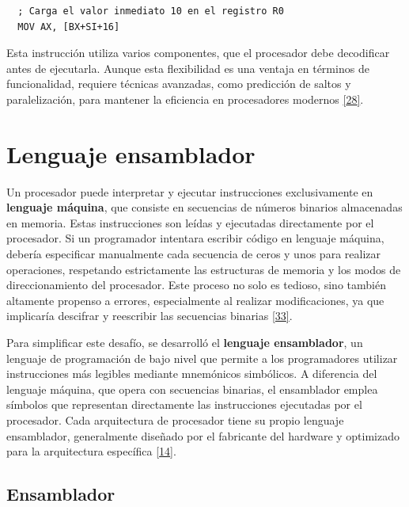 \documentclass[12pt,oneside]{templates/unerthesis}
\begin{document}
\begin{lstlisting}
  ; Carga el valor inmediato 10 en el registro R0
  MOV AX, [BX+SI+16]
  \end{lstlisting}

Esta instrucción utiliza varios componentes, que el procesador debe decodificar antes de ejecutarla. Aunque esta flexibilidad es una ventaja en términos de funcionalidad, requiere técnicas avanzadas, como predicción de saltos y paralelización, para mantener la eficiencia en procesadores modernos \protect\hyperlink{ref-patterson_computer_2014}{{[}28{]}}.

\hypertarget{lenguaje-ensamblador}{%
\section{Lenguaje ensamblador}\label{lenguaje-ensamblador}}

Un procesador puede interpretar y ejecutar instrucciones exclusivamente en \textbf{lenguaje máquina}, que consiste en secuencias de números binarios almacenadas en memoria. Estas instrucciones son leídas y ejecutadas directamente por el procesador. Si un programador intentara escribir código en lenguaje máquina, debería especificar manualmente cada secuencia de ceros y unos para realizar operaciones, respetando estrictamente las estructuras de memoria y los modos de direccionamiento del procesador. Este proceso no solo es tedioso, sino también altamente propenso a errores, especialmente al realizar modificaciones, ya que implicaría descifrar y reescribir las secuencias binarias \protect\hyperlink{ref-irvine2011assembly}{{[}33{]}}.

Para simplificar este desafío, se desarrolló el \textbf{lenguaje ensamblador}, un lenguaje de programación de bajo nivel que permite a los programadores utilizar instrucciones más legibles mediante mnemónicos simbólicos. A diferencia del lenguaje máquina, que opera con secuencias binarias, el ensamblador emplea símbolos que representan directamente las instrucciones ejecutadas por el procesador. Cada arquitectura de procesador tiene su propio lenguaje ensamblador, generalmente diseñado por el fabricante del hardware y optimizado para la arquitectura específica \protect\hyperlink{ref-stallings_computer_2013}{{[}14{]}}.

\hypertarget{ensamblador}{%
\subsection{Ensamblador}\label{ensamblador}}
\end{document}

